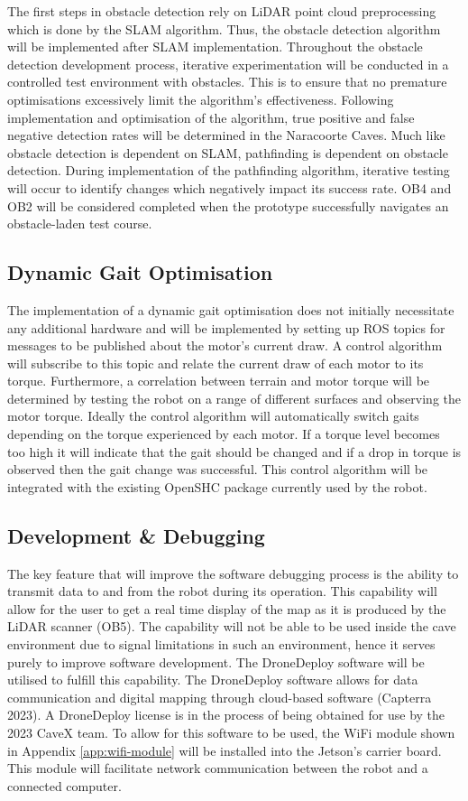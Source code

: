 The first steps in obstacle detection rely on LiDAR point cloud preprocessing which is done by the SLAM algorithm. Thus, the obstacle detection algorithm will be implemented after SLAM implementation. Throughout the obstacle detection development process, iterative experimentation will be conducted in a controlled test environment with obstacles. This is to ensure that no premature optimisations excessively limit the algorithm's effectiveness. Following implementation and optimisation of the algorithm, true positive and false negative detection rates will be determined in the Naracoorte Caves. Much like obstacle detection is dependent on SLAM, pathfinding is dependent on obstacle detection. During implementation of the pathfinding algorithm, iterative testing will occur to identify changes which negatively impact its success rate. OB4 and OB2 will be considered completed when the prototype successfully navigates an obstacle-laden test course.

\subsection{Dynamic Gait Optimisation}
The implementation of a dynamic gait optimisation does not initially necessitate any additional hardware and will be implemented by setting up ROS topics for messages to be published about the motor's current draw. A control algorithm will subscribe to this topic and relate the current draw of each motor to its torque. Furthermore, a correlation between terrain and motor torque will be determined by testing the robot on a range of different surfaces and observing the motor torque. Ideally the control algorithm will automatically switch gaits depending on the torque experienced by each motor. If a torque level becomes too high it will indicate that the gait should be changed and if a drop in torque is observed then the gait change was successful. This control algorithm will be integrated with the existing OpenSHC package currently used by the robot.

\subsection{Development \& Debugging}
The key feature that will improve the software debugging process is the ability to transmit data to and from the robot during its operation. This capability will allow for the user to get a real time display of the map as it is produced by the LiDAR scanner (OB5). The capability will not be able to be used inside the cave environment due to signal limitations in such an environment, hence it serves purely to improve software development. The DroneDeploy software will be utilised to fulfill this capability. The DroneDeploy software allows for data communication and digital mapping through cloud-based software (Capterra 2023). A DroneDeploy license is in the process of being obtained for use by the 2023 CaveX team. To allow for this software to be used, the WiFi module shown in Appendix \ref{app:wifi-module} will be installed into the Jetson's carrier board. This module will facilitate network communication between the robot and a connected computer.

